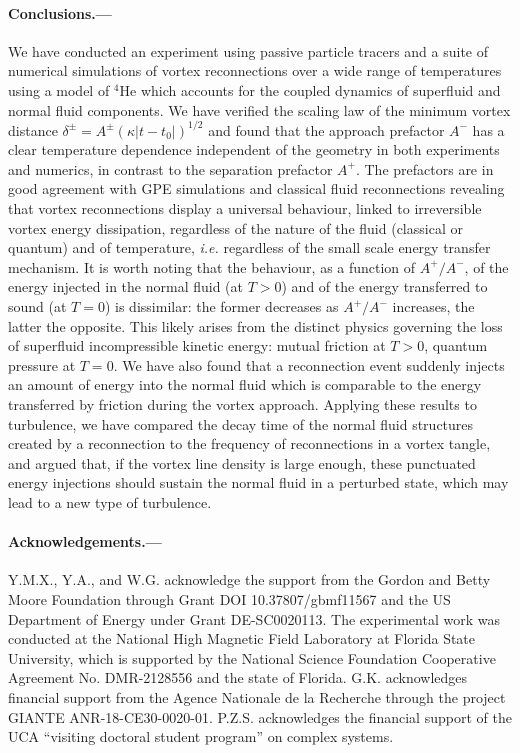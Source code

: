 \documentclass[%
 reprint,
unsortedaddress,
 amsmath,amssymb,
 aps,
 prl,
]{revtex4-2}
\begin{document}
\paragraph*{Conclusions.---} We have conducted an experiment using passive particle tracers and a suite of numerical simulations of vortex reconnections over a wide range of temperatures using a model of $^4$He which accounts for the coupled dynamics of superfluid and normal fluid components.
We have verified the scaling law of the minimum vortex distance 
$\delta^{\pm}=A^{\pm} (\kappa |t-t_0|)^{1/2}$ and found that the approach prefactor $A^-$ has a clear temperature dependence independent of the geometry in both experiments and numerics, in contrast to the
separation prefactor $A^+$. The prefactors are in good agreement
with GPE simulations \cite{villoisIrreversibleDynamicsVortex2020,allen2014} 
and classical fluid reconnections \cite{yaoSeparationScalingViscous2020}
revealing that vortex reconnections display a universal behaviour, linked to irreversible vortex energy dissipation, regardless of the nature
of the fluid (classical or quantum) and of temperature, \textit{i.e.} regardless of the small scale energy transfer mechanism. 
It is worth noting that the behaviour, as a function of $A^+/A^-$, of 
the energy injected in the normal fluid (at $T>0$) and of the energy transferred to sound (at $T=0$)
\cite{villoisIrreversibleDynamicsVortex2020,leadbeaterSoundEmissionDue2001b} is dissimilar: the former decreases as $A^+/A^-$
increases, the latter the opposite. This likely arises from the distinct physics governing the loss of superfluid 
incompressible kinetic energy: mutual friction at $T>0$, quantum pressure at $T=0$.
We have also found that a reconnection event suddenly injects an amount of energy 
into the normal fluid which is comparable to the energy transferred by friction
during the vortex approach. Applying these results to turbulence, we have
compared the decay time of the normal fluid structures created by a
reconnection to the frequency of reconnections in a vortex tangle, and argued
that, if the vortex line density is large enough, these punctuated
energy injections should sustain the normal fluid in a perturbed state, which may lead to a new type of turbulence.

\paragraph*{Acknowledgements.---} Y.M.X., Y.A., and W.G. acknowledge the support from the Gordon and Betty Moore Foundation through Grant DOI 10.37807/gbmf11567 and the US Department of Energy under Grant DE-SC0020113. The experimental work was conducted at the National High Magnetic Field Laboratory at Florida State University, which is supported by the National Science Foundation Cooperative Agreement No. DMR-2128556 and the state of Florida. G.K. acknowledges financial support from the Agence Nationale de la Recherche through the project GIANTE ANR-18-CE30-0020-01. P.Z.S. acknowledges the financial support of the UCA ``visiting doctoral student program'' on complex systems.
\end{document}
